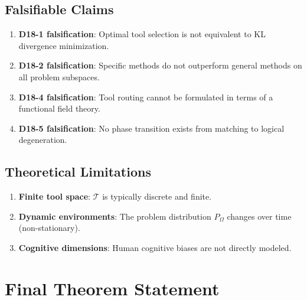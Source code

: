 \documentclass[12pt, a4paper]{article}
\begin{document}
\subsection{Falsifiable Claims}
\begin{enumerate}
\item \textbf{D18-1 falsification}: Optimal tool selection is not equivalent to KL divergence minimization.
\item \textbf{D18-2 falsification}: Specific methods do not outperform general methods on all problem subspaces.
\item \textbf{D18-4 falsification}: Tool routing cannot be formulated in terms of a functional field theory.
\item \textbf{D18-5 falsification}: No phase transition exists from matching to logical degeneration.
\end{enumerate}

\subsection{Theoretical Limitations}
\begin{enumerate}
\item \textbf{Finite tool space}: $\mathcal{T}$ is typically discrete and finite.
\item \textbf{Dynamic environments}: The problem distribution $P_{\Omega}$ changes over time (non-stationary).
\item \textbf{Cognitive dimensions}: Human cognitive biases are not directly modeled.
\end{enumerate}

\section{Final Theorem Statement}
\end{document}
